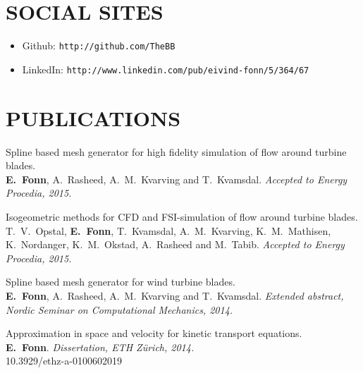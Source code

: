 \documentclass[line,margin]{res}
\newcommand{\zh}{Z\"{u}rich}
\begin{document}
\begin{resume}
\section{SOCIAL SITES}

\begin{itemize}
\item Github: \texttt{http://github.com/TheBB}
\item LinkedIn: \texttt{http://www.linkedin.com/pub/eivind-fonn/5/364/67}
\end{itemize}


\section{PUBLICATIONS}

Spline based mesh generator for high fidelity simulation of flow around turbine blades. \\
{\bf E.~Fonn}, A.~Rasheed, A.~M.~Kvarving and T.~Kvamsdal.
{\em Accepted to Energy Procedia, 2015.}

Isogeometric methods for CFD and FSI-simulation of flow around turbine blades. \\
T.~V.~Opstal, {\bf E.~Fonn}, T.~Kvamsdal, A.~M.~Kvarving, K.~M.~Mathisen,
K.~Nordanger, K.~M.~Okstad, A.~Rasheed and M.~Tabib.
{\em Accepted to Energy Procedia, 2015.}




Spline based mesh generator for wind turbine blades. \\
{\bf E.~Fonn}, A.~Rasheed, A.~M.~Kvarving and T.~Kvamsdal.
{\em Extended abstract,  Nordic Seminar on Computational Mechanics, 2014.}

Approximation in space and velocity for kinetic transport equations. \\
{\bf E.~Fonn}.
{\em Dissertation, ETH \zh, 2014.} \\
10.3929/ethz-a-0100602019


\end{resume}
\end{document}

